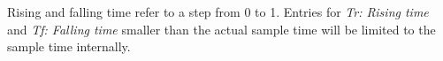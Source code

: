Rising and falling time refer to a step from 0 to 1.
Entries for \textit{Tr: Rising time} and \textit{Tf: Falling time} smaller than the actual sample time will be limited to the sample time internally.
